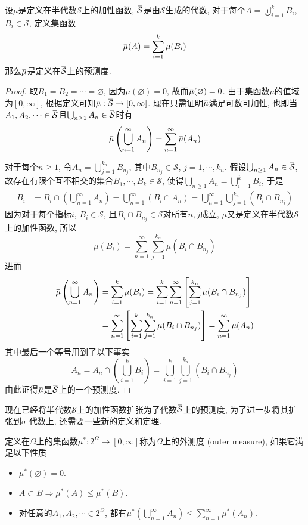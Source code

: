 \documentclass[cn, 12pt, math=mtpro2, bibstyle=apa, blue, twocol]{elegantbook}
\newcommand{\SE}{\mathcal{S}}
\newcommand{\overbar}[1]{\mkern 1.5mu\overline{\mkern-1.5mu#1\mkern-1.5mu}\mkern 1.5mu}
\let\emptyset\varnothing
\begin{document}
\begin{theorem}\label{thm:thm1.3}
  设$\mu$是定义在半代数$\SE$上的加性函数, $\overbar{\SE}$是由$\SE$生成的代数, 对于每个$A=\biguplus_{i=1}^kB_i$, $B_i\in\SE$, 定义集函数
  $$\overbar{\mu}(A)=\sum_{i=1}^{k}\mu(B_i)$$
  那么$\overbar{\mu}$是定义在$\overbar{\SE}$上的预测度.
\end{theorem}
\begin{proof}
  取$B_1=B_2=\cdots=\emptyset$, 因为$\mu(\emptyset)=0$, 故而$\overbar{\mu}(\emptyset)=0$. 由于集函数$\mu$的值域为$[0,\infty]$, 根据定义可知$\overbar{\mu}:\overbar{\SE}\to[0,\infty]$. 现在只需证明$\overbar{\mu}$满足可数可加性, 也即当$A_1,A_2,\cdots\in\overbar{\SE}$且$\bigcup_{n\geq1}A_n\in\overbar{\SE}$时有$$\overbar{\mu}\left(\bigcup_{n=1}^\infty A_n\right)=\sum_{n=1}^\infty\overbar{\mu}(A_n)$$

  对于每个$n\ge1$, 令$A_n=\biguplus_{j=1}^{k_n}B_{n_j}$, 其中$B_{n_j}\in\SE$, $j=1,\cdots,k_n$. 假设$\bigcup_{n\ge1}A_n\in \overbar{\SE}$, 故存在有限个互不相交的集合$B_1,\cdots,B_k\in\SE$, 使得$\bigcup_{n\ge1}A_n=\bigcup_{i=1}^kB_i$, 于是
  \begin{align*}
  B_i&=B_i\cap\left(\bigcup_{n=1}^\infty A_n \right)=\bigcup_{n=1}^\infty (B_i\cap A_n)=\bigcup_{n=1}^\infty\bigcup_{j=1}^{k_n}(B_i\cap B_{n_j})
  \end{align*}
  因为对于每个指标$i$, $B_i\in\SE$, 且$B_i\cap B_{n_j}\in\SE$对所有$n, j$成立, $\mu$又是定义在半代数$\SE$上的加性函数, 所以
  $$\mu(B_i)=\sum_{n=1}^{\infty}\sum_{j=1}^{k_n}\mu(B_i\cap B_{n_j})$$
  进而
  \begin{align*}
  \overbar{\mu}\left(\bigcup_{n=1}^\infty A_n\right)&=\sum_{i=1}^{k}\mu(B_i)=\sum_{i=1}^{k}\sum_{n=1}^{\infty}\left[\sum_{j=1}^{k_n}\mu(B_i\cap B_{n_j})\right] \\
  &=\sum_{n=1}^{\infty}\left[\sum_{i=1}^{k}\sum_{j=1}^{k_n}\mu(B_i\cap B_{n_j}) \right]=\sum_{n=1}^{\infty}\overbar{\mu}(A_n)
  \end{align*}
  其中最后一个等号用到了以下事实
  $$A_n=A_n\cap\left(\bigcup_{i=1}^kB_i\right)=\bigcup_{i=1}^k\bigcup_{j=1}^{k_n}(B_i\cap B_{n_j})$$
  由此证得$\overbar{\mu}$是$\overbar{\SE}$上的一个预测度.
\end{proof}
现在已经将半代数$\SE$上的加性函数扩张为了代数$\overbar{\SE}$上的预测度, 为了进一步将其扩张到$\sigma$-代数上, 还需要一些新的定义和定理.

\begin{definition}
定义在$\Omega$上的集函数$\mu^\ast: 2^\Omega\to [0,\infty]$称为$\Omega$上的外测度 (outer measure), 如果它满足以下性质
\begin{itemize}
  \item $\mu^\ast(\emptyset)=0$.
  \item $A\subset B\Rightarrow \mu^\ast(A)\leq\mu^\ast(B)$.
  \item 对任意的$A_1,A_2,\cdots\in 2^\Omega$, 都有$ \mu^\ast\left(\bigcup_{n=1}^\infty A_n\right)\leq\sum_{n=1}^{\infty}\mu^\ast(A_n)$.
\end{itemize}
\end{definition}
\end{document}
